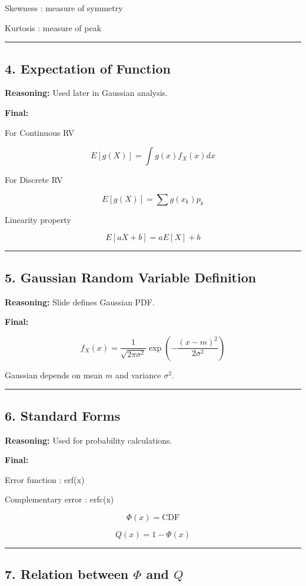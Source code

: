 \documentclass[12pt]{article}
\begin{document}
Skewness : measure of symmetry

Kurtosis : measure of peak

\hrule

\subsection*{4. Expectation of Function}

\textbf{Reasoning:}  
Used later in Gaussian analysis.

\textbf{Final:}

For Continuous RV

\[
E[g(X)] = \int g(x) f_X(x) dx
\]

For Discrete RV

\[
E[g(X)] = \sum g(x_k) p_k
\]

Linearity property

\[
E[aX + b] = aE[X] + b
\]

\hrule

\subsection*{5. Gaussian Random Variable Definition}

\textbf{Reasoning:}  
Slide defines Gaussian PDF.

\textbf{Final:}

\[
f_X(x) =
\frac{1}{\sqrt{2\pi\sigma^2}}
\exp \left(
-\frac{(x-m)^2}{2\sigma^2}
\right)
\]

Gaussian depends on mean $m$ and variance $\sigma^2$.

\hrule

\subsection*{6. Standard Forms}

\textbf{Reasoning:}  
Used for probability calculations.

\textbf{Final:}

Error function : erf(x)

Complementary error : erfc(x)

\[
\Phi(x) = \text{CDF}
\]

\[
Q(x) = 1 - \Phi(x)
\]

\hrule

\subsection*{7. Relation between $\Phi$ and $Q$}
\end{document}
